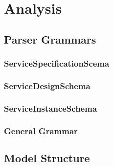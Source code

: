 \chapter{Analysis}

\section{Parser Grammars}

\subsection{ServiceSpecificationScema}
\subsection{ServiceDesignSchema}
\subsection{ServiceInstanceSchema}
\subsection{General Grammar}

\section{Model Structure}